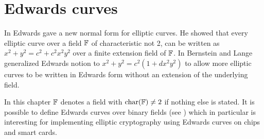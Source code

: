 \chapter{Edwards curves}
\label{cha:edwardsCurves}
In \cite{edwards07} Edwards gave a new normal form for elliptic curves. He showed that every elliptic curve over a field $\mathbb{F}$ of characteristic not 2, can be written as $x^2+y^2=c^2+c^2x^2y^2$ over a finite extension field of $\mathbb{F}$. In \cite{BL07} Bernstein and Lange generalized Edwards notion to $x^2+y^2=c^2(1+dx^2y^2)$ to allow more elliptic curves to be written in Edwards form without an extension of the underlying field. 

In this chapter $\mathbb{F}$ denotes a field with $\text{char}(\mathbb{F})\neq 2$ if nothing else is stated. It is possible to define Edwards curves over binary fields (see \cite{binaryEdwards}) which in particular is interesting for implementing elliptic cryptography using Edwards curves on chips and smart cards. 

